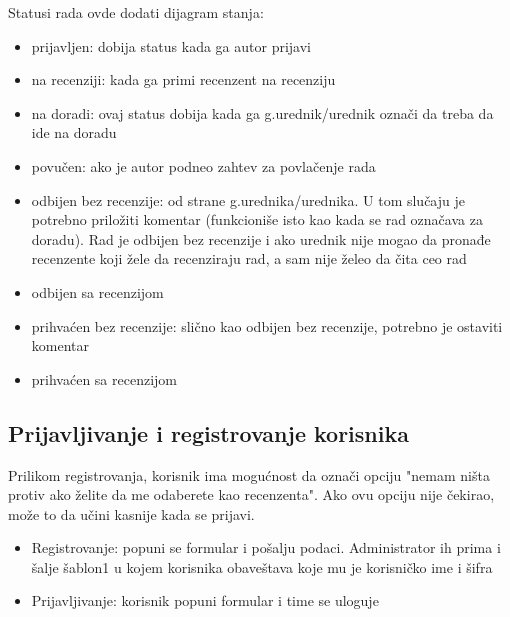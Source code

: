\documentclass[a4paper]{article}
\begin{document}
    Statusi rada ovde dodati dijagram stanja:
    \begin{itemize}
        \item prijavljen: dobija status kada ga autor prijavi
        \item na recenziji: kada ga primi recenzent na recenziju
        \item na doradi: ovaj status dobija kada ga g.urednik/urednik označi da treba da ide na doradu
        \item povučen: ako je autor podneo zahtev za povlačenje rada
        \item odbijen bez recenzije: od strane g.urednika/urednika. U tom slučaju je potrebno priložiti komentar (funkcioniše isto kao kada se rad označava za doradu). Rad je odbijen bez recenzije i ako urednik nije mogao da pronađe recenzente koji žele da recenziraju rad, a sam nije želeo da čita ceo rad
        \item odbijen sa recenzijom
        \item prihvaćen bez recenzije: slično kao odbijen bez recenzije, potrebno je ostaviti komentar
        \item prihvaćen sa recenzijom
    \end{itemize}
    
    
\subsection{Prijavljivanje i registrovanje korisnika}
Prilikom registrovanja, korisnik ima mogućnost da označi opciju "nemam ništa protiv ako želite da me odaberete kao recenzenta". Ako ovu opciju nije čekirao, može to da učini kasnije kada se prijavi.
\begin{itemize}
    \item Registrovanje: popuni se formular i pošalju podaci. Administrator ih prima i šalje šablon1 u kojem korisnika obaveštava koje mu je korisničko ime i šifra
    \item Prijavljivanje: korisnik popuni formular i time se uloguje
\end{itemize}
    
\end{document}
